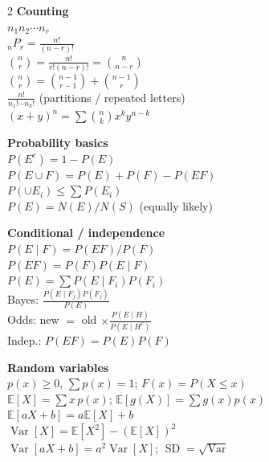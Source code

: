 \documentclass[11pt]{article}
\newcommand{\E}{\mathbb{E}}
\newcommand{\Var}{\operatorname{Var}}
\newcommand{\SD}{\operatorname{SD}}
\newcommand{\nCr}[2]{\binom{#1}{#2}}
\newcommand{\nPr}[2]{{}_{#1}P_{#2}}
\begin{document}
\begin{multicols}{2}
\textbf{Counting}\\
$n_1n_2\cdots n_r$\\
$\nPr nr=\frac{n!}{(n-r)!}$\\
$\nCr nr=\frac{n!}{r!(n-r)!}=\nCr n{n-r}$\\
$\nCr nr=\nCr{n-1}{r-1}+\nCr{n-1}r$\\
$\frac{n!}{n_1!\cdots n_k!}$ (partitions / repeated letters)\\
$(x+y)^n=\sum\nCr nk x^ky^{n-k}$

\textbf{Probability basics}\\
$P(E^c)=1-P(E)$\\
$P(E\cup F)=P(E)+P(F)-P(EF)$\\
$P(\cup E_i)\le\sum P(E_i)$\\
$P(E)=N(E)/N(S)$ (equally likely)

\columnbreak

\textbf{Conditional / independence}\\
$P(E\mid F)=P(EF)/P(F)$\\
$P(EF)=P(F)P(E\mid F)$\\
$P(E)=\sum P(E\mid F_i)P(F_i)$\\
Bayes: $\frac{P(E\mid F_j)P(F_j)}{P(E)}$\\
Odds: new $=$ old $\times\frac{P(E\mid H)}{P(E\mid H^c)}$\\
Indep.: $P(EF)=P(E)P(F)$

\textbf{Random variables}\\
$p(x)\ge0$, $\sum p(x)=1$; $F(x)=P(X\le x)$\\
$\E[X]=\sum x\,p(x)$; $\E[g(X)]=\sum g(x)p(x)$\\
$\E[aX+b]=a\E[X]+b$\\
$\Var[X]=\E[X^2]-(\E[X])^2$\\
$\Var[aX+b]=a^2\Var[X]$; $\SD=\sqrt{\Var}$
\end{multicols}
\end{document}
